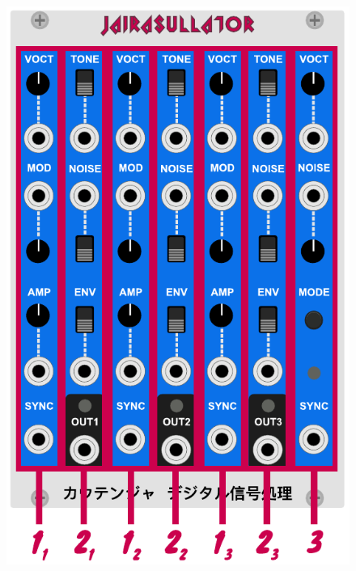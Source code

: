 \documentclass[12pt,letter]{article}
\begin{document}
\begin{figure}[!htp]
\centering
\includegraphics{img/Interface}
\end{figure}

\end{document}
